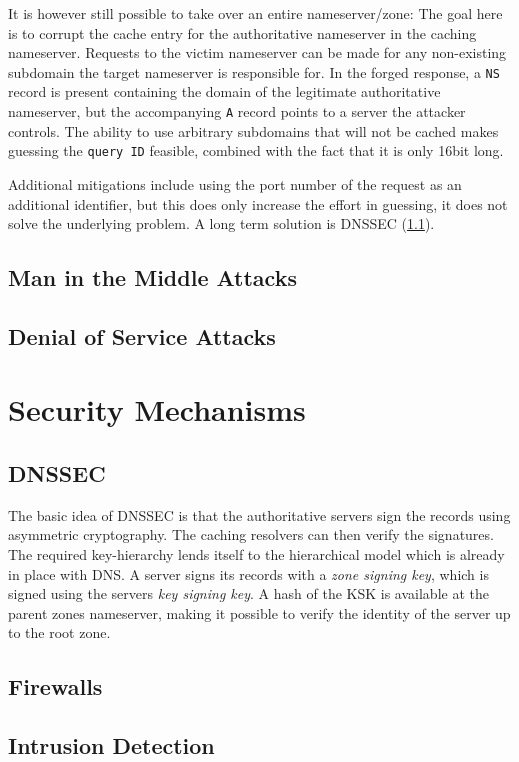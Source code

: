 It is however still possible to take over an entire nameserver/zone: The goal
here is to corrupt the cache entry for the authoritative nameserver in the
caching nameserver. Requests to the victim nameserver can be made for any
non-existing subdomain the target nameserver is responsible for. In the forged
response, a \texttt{NS} record is present containing the domain of the
legitimate authoritative nameserver, but the accompanying \texttt{A} record
points to a server the attacker controls. The ability to use arbitrary
subdomains that will not be cached makes guessing the \texttt{query ID}
feasible, combined with the fact that it is only 16bit long.

Additional mitigations include using the port number of the request as an
additional identifier, but this does only increase the effort in guessing, it
does not solve the underlying problem. A long term solution is DNSSEC
(\cref{sec:dnssec}).


\subsection{Man in the Middle Attacks}

\subsection{Denial of Service Attacks}

\section{Security Mechanisms}

\subsection{DNSSEC}
\label{sec:dnssec}
The basic idea of DNSSEC is that the authoritative servers sign the records
using asymmetric cryptography. The caching resolvers can then verify the
signatures. The required key-hierarchy lends itself to the hierarchical model
which is already in place with DNS. A server signs its records with a \emph{zone
signing key}, which is signed using the servers \emph{key signing key}. A hash
of the KSK is available at the parent zones nameserver, making it possible to
verify the identity of the server up to the root zone.

\subsection{Firewalls}

\subsection{Intrusion Detection}
